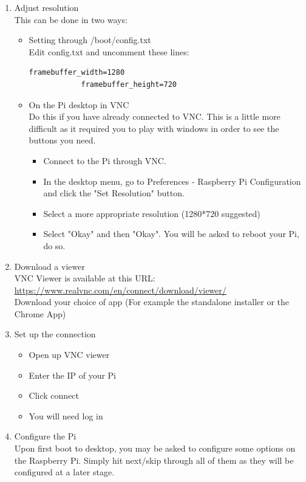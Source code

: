 \begin{enumerate}
    \item Adjust resolution\\
    This can be done in two ways:
    \begin{itemize}
        \item Setting through /boot/config.txt\\
            Edit config.txt and uncomment these lines:
            \begin{lstlisting}[gobble=12]
            framebuffer_width=1280
            framebuffer_height=720
            \end{lstlisting}
        \item On the Pi desktop in VNC\\
            Do this if you have already connected to VNC. This is a little more difficult as it required you to play with windows in order to see the buttons you need.
            \begin{itemize}
                \item Connect to the Pi through VNC. 
                \item In the desktop menu, go to Preferences - Raspberry Pi Configuration and click the "Set Resolution" button. 
                \item Select a more appropriate resolution (1280*720 suggested)
                \item Select "Okay" and then "Okay". You will be asked to reboot your Pi, do so.
            \end{itemize}
    \end{itemize}
    \item Download a viewer\\
    VNC Viewer is available at this URL:\\ \href{https://www.realvnc.com/en/connect/download/viewer/}{https://www.realvnc.com/en/connect/download/viewer/}\\ 
    Download your choice of app (For example the standalone installer or the Chrome App)
    \item Set up the connection
        \begin{itemize}
            \item Open up VNC viewer
            \item Enter the IP of your Pi
            \item Click connect
            \item You will need log in
        \end{itemize}
    \item Configure the Pi\\
    Upon first boot to desktop, you may be asked to configure some options on the Raspberry Pi. Simply hit next/skip through all of them as they will be configured at a later stage.
\end{enumerate}

